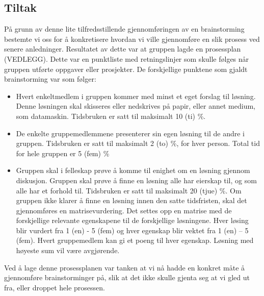 \subsection{Tiltak}
På grunn av denne lite tilfredsstillende gjennomføringen av en brainstorming bestemte vi oss for å konkretisere hvordan vi ville gjennomføre en slik prosess ved senere anledninger. Resultatet av dette var at gruppen lagde en prosessplan (VEDLEGG). Dette var en punktliste med retningslinjer som skulle følges når gruppen utførte oppgaver eller prosjekter. De forskjellige punktene som gjaldt brainstorming var som følger:
\begin{itemize}
\item Hvert enkeltmedlem i gruppen kommer med minst et eget forslag til løsning. Denne løsningen skal skisseres eller nedskrives på papir, eller annet medium, som datamaskin. Tidsbruken er satt til maksimalt 10 (ti) \%.

\item De enkelte gruppemedlemmene presenterer sin egen løsning til de andre i gruppen. Tidsbruken er satt til maksimalt 2 (to) \%, for hver person. Total tid for hele gruppen er 5 (fem) \%
 
\item Gruppen skal i felleskap prøve å komme til enighet om en løsning gjennom diskusjon. Gruppen skal prøve å finne en løsning alle har eierskap til, og som alle har et forhold til. Tidsbruken er satt til maksimalt 20 (tjue) \%. Om gruppen ikke klarer å finne en løsning innen den satte tidsfristen, skal det gjennomføres en matrisevurdering. Det settes opp en matrise med de forskjellige relevante egenskapene til de forskjellige løsningene. Hver løsing blir vurdert fra 1 (en) - 5 (fem) og hver egenskap blir vektet fra 1 (en) – 5 (fem). Hvert gruppemedlem kan gi et poeng til hver egenskap. Løsning med høyeste sum vil være avgjørende.
\end{itemize}
Ved å lage denne prosessplanen var tanken at vi nå hadde en konkret måte å gjennomføre brainstorminger på, slik at det ikke skulle gjenta seg at vi gled ut fra, eller droppet hele prosessen.

